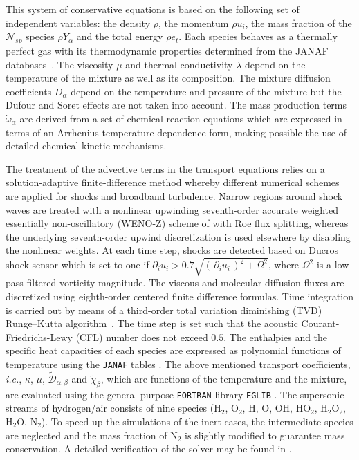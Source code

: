 \documentclass[conf]{new-aiaa}
\newcommand{\pars}[1]{\left(\,{#1}\,\right)}
\newcommand{\addim}[1]{{#1}} %
\newcommand{\nspc}{\mathcal{N}_{sp}}
\begin{document}
%
This system of conservative equations is based on the following set of independent variables: the density $\addim{\rho}$, the momentum $\addim{\rho} \addim{u}_i$, the mass fraction of the $\nspc$ species $\addim{\rho} Y_{\alpha}$ and the total energy $\addim{\rho} \addim{e}_t$. Each species behaves as a thermally perfect gas with its thermodynamic properties determined from the JANAF databases~\cite{sta1971}. The viscosity $\addim{\mu}$ and thermal conductivity $\addim{\lambda}$ depend on the temperature of the mixture as well as its composition. The mixture diffusion coefficients $\addim{D}_{\alpha}$ depend on the temperature and pressure of the mixture but the Dufour and Soret effects are not taken into account. The mass production terms $\addim{\dot{\omega}}_\alpha$ are derived from a set of chemical reaction equations which are expressed in terms of an Arrhenius temperature dependence form, making possible the use of detailed chemical kinetic mechanisms.

The treatment of the advective terms in the transport equations relies on a solution-adaptive finite-difference method whereby different numerical schemes are applied for shocks and broadband turbulence.
%
Narrow regions around shock waves are treated with a nonlinear upwinding seventh-order accurate weighted essentially non-oscillatory (WENO-Z) scheme of \citet{don2013accuracy} with Roe flux splitting, whereas the underlying seventh-order upwind discretization is used elsewhere by disabling the nonlinear weights.
%
At each time step, shocks are detected based on Ducros \cite{ducros1999large} shock sensor which is set to one if $\partial_i u_i>0.7\sqrt{\pars{\partial_i u_i}^2+\Omega^2}$, where $\Omega^2$ is a low-pass-filtered vorticity magnitude.
%
The viscous and molecular diffusion fluxes are discretized using eighth-order centered finite difference formulas.
%
Time integration is carried out by means of a third-order total variation diminishing (TVD) Runge--Kutta algorithm~\cite{gottlieb1998total}.
%
The time step is set such that the acoustic Courant-Friedrichs-Lewy (CFL) number does not exceed $0.5$.
%
The enthalpies and the specific heat capacities of each species are expressed as polynomial functions of temperature using the \texttt{JANAF} tables \cite{stull1971janaf}. %
The above mentioned transport coefficients, \textit{i.e.}, $\kappa$, $\mu$, $\widetilde{\mathcal{D}}_{\alpha,\beta}$ and $\tilde{\chi}_{\beta}$, which are functions of the temperature and the mixture, are evaluated using the general purpose \texttt{FORTRAN} library \texttt{EGLIB} \cite{ern_eglib_2004}.
%
The supersonic streams of hydrogen/air consists of nine species ($\mathrm{H_2}$, $\mathrm{O_2}$, $\mathrm{H}$, $\mathrm{O}$, $\mathrm{OH}$, $\mathrm{HO_2}$, $\mathrm{H_2O_2}$, $\mathrm{H_2O}$, $\mathrm{N_2}$).
%
To speed up the simulations of the inert cases, the intermediate species are neglected and the mass fraction of $\mathrm{N_2}$ is slightly modified to guarantee mass conservation.
%
A detailed verification of the solver may be found in \cite{boukharfane2018contribution}.
\end{document}

